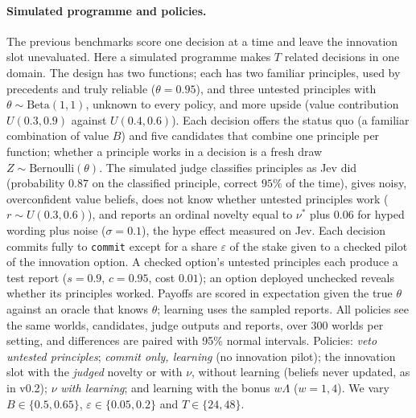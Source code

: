 \documentclass[11pt]{article}
\theoremstyle{definition}
\begin{document}
\paragraph{Simulated programme and policies.} The previous benchmarks score one decision at a time and leave the innovation
slot unevaluated. Here a simulated programme makes $T$ related decisions in one domain. The design
has two functions; each has two familiar principles, used by precedents and truly reliable
($\theta=0.95$), and three untested principles with $\theta\sim\mathrm{Beta}(1,1)$, unknown to every
policy, and more upside (value contribution $U(0.3,0.9)$ against $U(0.4,0.6)$). Each decision offers
the status quo (a familiar combination of value $B$) and five candidates that combine one principle
per function; whether a principle works in a decision is a fresh draw $Z\sim\mathrm{Bernoulli}(\theta)$.
The simulated judge classifies principles as Jev did (probability $0.87$ on the classified principle,
correct $95\%$ of the time), gives noisy, overconfident value beliefs, does not know whether untested
principles work ($r\sim U(0.3,0.6)$), and reports an ordinal novelty equal to $\nu^\ast$ plus $0.06$
for hyped wording plus noise ($\sigma=0.1$), the hype effect measured on Jev. Each decision commits
fully to \texttt{commit} except for a share $\varepsilon$ of the stake given to a checked pilot of the
innovation option. A checked option's untested principles each produce a test report ($s=0.9$,
$c=0.95$, cost $0.01$); an option deployed unchecked reveals whether its principles worked.
Payoffs are scored in expectation given the true $\theta$ against an oracle that knows $\theta$;
learning uses the sampled reports. All policies see the same worlds, candidates, judge outputs and
reports, over 300 worlds per setting, and differences are paired with 95\% normal intervals.
Policies: \emph{veto untested principles}; \emph{commit only, learning} (no innovation pilot);
the innovation slot with the \emph{judged} novelty or with $\nu$, without learning (beliefs never
updated, as in v0.2); $\nu$ \emph{with learning}; and learning with the bonus $w\Lambda$ ($w=1,4$).
We vary $B\in\{0.5,0.65\}$, $\varepsilon\in\{0.05,0.2\}$ and $T\in\{24,48\}$.
\end{document}

